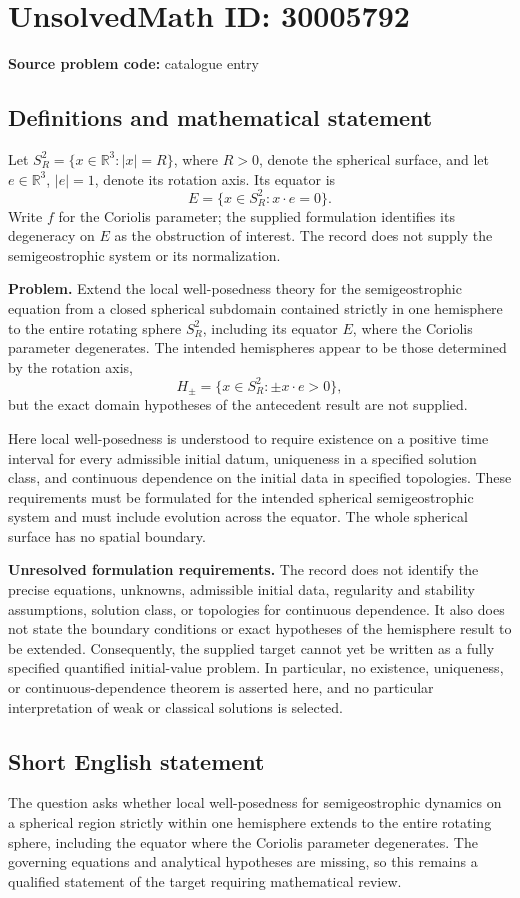 \documentclass[11pt]{article}
\newcommand{\R}{\mathbb{R}}
\begin{document}
\section*{UnsolvedMath ID: 30005792}
\textbf{Source problem code:} catalogue entry
\subsection{Definitions and mathematical statement}
Let \(S_R^2=\{x\in\R^3:|x|=R\}\), where \(R>0\), denote the spherical surface, and let \(e\in\R^3\), \(|e|=1\), denote its rotation axis. Its equator is
\[
E=\{x\in S_R^2:x\cdot e=0\}.
\]
Write \(f\) for the Coriolis parameter; the supplied formulation identifies its degeneracy on \(E\) as the obstruction of interest. The record does not supply the semigeostrophic system or its normalization.

\textbf{Problem.} Extend the local well-posedness theory for the semigeostrophic equation from a closed spherical subdomain contained strictly in one hemisphere to the entire rotating sphere \(S_R^2\), including its equator \(E\), where the Coriolis parameter degenerates. The intended hemispheres appear to be those determined by the rotation axis,
\[
H_\pm=\{x\in S_R^2:\pm x\cdot e>0\},
\]
but the exact domain hypotheses of the antecedent result are not supplied.

Here local well-posedness is understood to require existence on a positive time interval for every admissible initial datum, uniqueness in a specified solution class, and continuous dependence on the initial data in specified topologies. These requirements must be formulated for the intended spherical semigeostrophic system and must include evolution across the equator. The whole spherical surface has no spatial boundary.

\textbf{Unresolved formulation requirements.} The record does not identify the precise equations, unknowns, admissible initial data, regularity and stability assumptions, solution class, or topologies for continuous dependence. It also does not state the boundary conditions or exact hypotheses of the hemisphere result to be extended. Consequently, the supplied target cannot yet be written as a fully specified quantified initial-value problem. In particular, no existence, uniqueness, or continuous-dependence theorem is asserted here, and no particular interpretation of weak or classical solutions is selected.
\subsection{Short English statement}
The question asks whether local well-posedness for semigeostrophic dynamics on a spherical region strictly within one hemisphere extends to the entire rotating sphere, including the equator where the Coriolis parameter degenerates. The governing equations and analytical hypotheses are missing, so this remains a qualified statement of the target requiring mathematical review.
\end{document}
